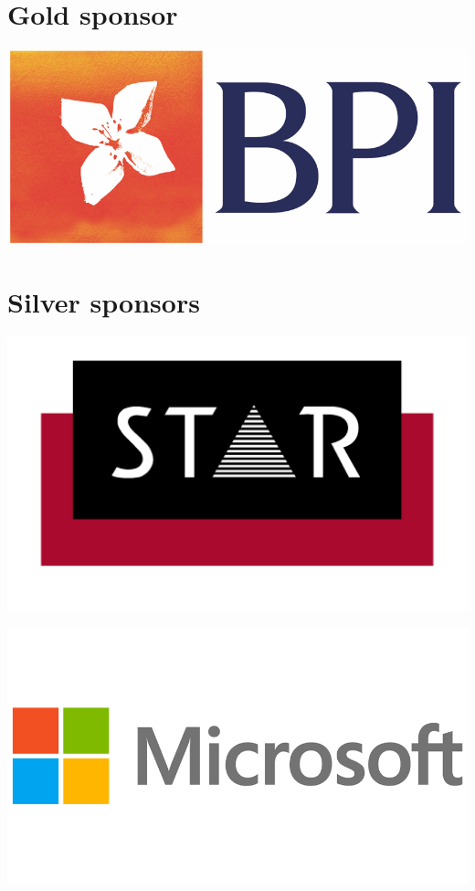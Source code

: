 \documentclass[a4paper,11pt,twoside]{book}
\begin{document}
\section*{Gold sponsor}

\vfill

\begin{center}
\includegraphics[width=1\columnwidth]{logos/bpi-logo.png}
\end{center}

\vfill

\section*{Silver sponsors}

\vfill

\begin{center}
\includegraphics[width=0.8\columnwidth]{logos/star-logo.png}

\vfill

\includegraphics[width=0.9\columnwidth]{logos/microsoft-logo.png}
\end{center}
\end{document}
